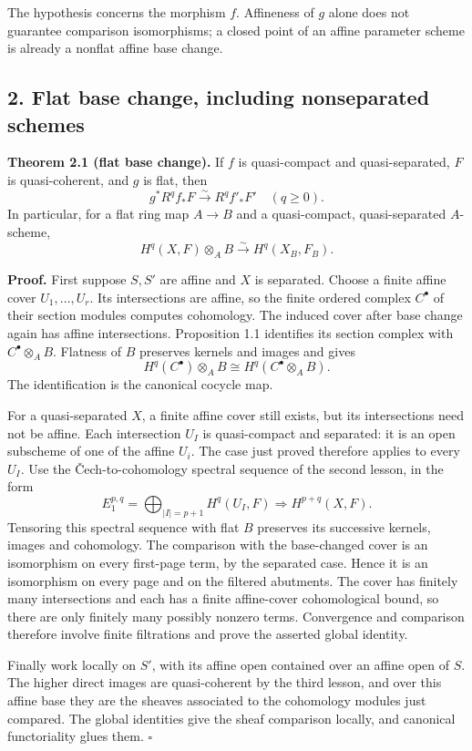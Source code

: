 \documentclass[11pt]{article}
\begin{document}
The hypothesis concerns the morphism \(f\). Affineness of \(g\) alone
does not guarantee comparison isomorphisms; a closed point of an affine
parameter scheme is already a nonflat affine base change.

\subsection{2. Flat base change, including nonseparated
schemes}\label{flat-base-change-including-nonseparated-schemes}

\textbf{Theorem 2.1 (flat base change).} If \(f\) is quasi-compact and
quasi-separated, \(F\) is quasi-coherent, and \(g\) is flat, then \[
g^*R^qf_*F\xrightarrow{\sim}R^qf'_*F'\quad(q\geq0).
\] In particular, for a flat ring map \(A\to B\) and a quasi-compact,
quasi-separated \(A\)-scheme, \[
H^q(X,F)\otimes_A B\xrightarrow{\sim}H^q(X_B,F_B).
\]

\textbf{Proof.} First suppose \(S,S'\) are affine and \(X\) is
separated. Choose a finite affine cover \(U_1,\ldots,U_r\). Its
intersections are affine, so the finite ordered complex \(C^\bullet\) of
their section modules computes cohomology. The induced cover after base
change again has affine intersections. Proposition 1.1 identifies its
section complex with \(C^\bullet\otimes_A B\). Flatness of \(B\)
preserves kernels and images and gives \[
H^q(C^\bullet)\otimes_A B\cong H^q(C^\bullet\otimes_A B).
\] The identification is the canonical cocycle map.

For a quasi-separated \(X\), a finite affine cover still exists, but its
intersections need not be affine. Each intersection \(U_I\) is
quasi-compact and separated: it is an open subscheme of one of the
affine \(U_i\). The case just proved therefore applies to every \(U_I\).
Use the Čech-to-cohomology spectral sequence of the second lesson, in
the form \[
E_1^{p,q}=\bigoplus_{|I|=p+1}H^q(U_I,F)\Longrightarrow H^{p+q}(X,F).
\] Tensoring this spectral sequence with flat \(B\) preserves its
successive kernels, images and cohomology. The comparison with the
base-changed cover is an isomorphism on every first-page term, by the
separated case. Hence it is an isomorphism on every page and on the
filtered abutments. The cover has finitely many intersections and each
has a finite affine-cover cohomological bound, so there are only
finitely many possibly nonzero terms. Convergence and comparison
therefore involve finite filtrations and prove the asserted global
identity.

Finally work locally on \(S'\), with its affine open contained over an
affine open of \(S\). The higher direct images are quasi-coherent by the
third lesson, and over this affine base they are the sheaves associated
to the cohomology modules just compared. The global identities give the
sheaf comparison locally, and canonical functoriality glues them.
\(\square\)
\end{document}
